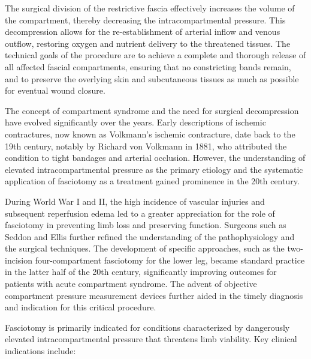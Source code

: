 The surgical division of the restrictive fascia effectively increases the volume of the compartment, thereby decreasing the intracompartmental pressure. This decompression allows for the re-establishment of arterial inflow and venous outflow, restoring oxygen and nutrient delivery to the threatened tissues. The technical goals of the procedure are to achieve a complete and thorough release of all affected fascial compartments, ensuring that no constricting bands remain, and to preserve the overlying skin and subcutaneous tissues as much as possible for eventual wound closure.

The concept of compartment syndrome and the need for surgical decompression have evolved significantly over the years. Early descriptions of ischemic contractures, now known as Volkmann's ischemic contracture, date back to the 19th century, notably by Richard von Volkmann in 1881, who attributed the condition to tight bandages and arterial occlusion. However, the understanding of elevated intracompartmental pressure as the primary etiology and the systematic application of fasciotomy as a treatment gained prominence in the 20th century.

During World War I and II, the high incidence of vascular injuries and subsequent reperfusion edema led to a greater appreciation for the role of fasciotomy in preventing limb loss and preserving function. Surgeons such as Seddon and Ellis further refined the understanding of the pathophysiology and the surgical techniques. The development of specific approaches, such as the two-incision four-compartment fasciotomy for the lower leg, became standard practice in the latter half of the 20th century, significantly improving outcomes for patients with acute compartment syndrome. The advent of objective compartment pressure measurement devices further aided in the timely diagnosis and indication for this critical procedure.

Fasciotomy is primarily indicated for conditions characterized by dangerously elevated intracompartmental pressure that threatens limb viability. Key clinical indications include:

